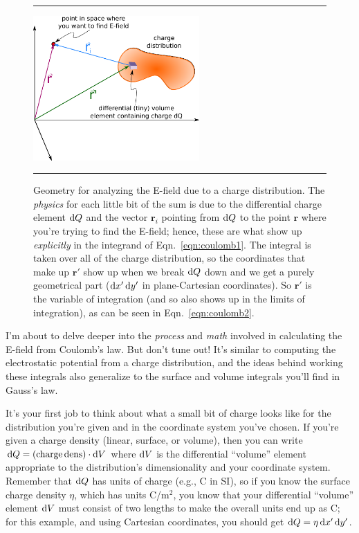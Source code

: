 \documentclass[10pt,letterpaper,twoside]{article}
\begin{document}
\begin{figure}[htb]
  \centering
  \vspace{5pt}
  \hrule%
  \vspace{10pt}
	\centering
	\includegraphics[keepaspectratio=true,width=2.50in]{./coordinate_system.pdf}
    \caption{Geometry for analyzing the E-field due to a charge distribution.
	The \textit{physics} for each little bit of the sum is due to the differential charge element $\text d Q$ and the vector $\bm r_i$ pointing from $\text d Q$ to the point $\bm r$ where you're trying to find the E-field; hence, these are what show up \textit{explicitly} in the integrand of Eqn.~\ref{eqn:coulomb1}.
	The integral is taken over all of the charge distribution, so the coordinates that make up $\bm r'$ show up when we break $\text d Q$ down and we get a purely geometrical part ($\text d x'\,\text d y'$ in plane-Cartesian coordinates).
	So $\bm r'$ is the variable of integration (and so also shows up in the limits of integration), as can be seen in Eqn.~\ref{eqn:coulomb2}.}
    \label{fig:coord_coulomb_distr}
  \hrule%
\vspace{10pt}
\end{figure}

I'm about to delve deeper into the \textit{process} and \textit{math} involved in calculating the E-field from Coulomb's law.
But don't tune out!
It's similar to computing the electrostatic potential from a charge distribution, and the ideas behind working these integrals also generalize to the surface and volume integrals you'll find in Gauss's law.

It's your first job to think about what a small bit of charge looks like for the distribution you're given and in the coordinate system you've chosen.
If you're given a charge density (linear, surface, or volume), then you can write $\text d Q = (\text{charge\,dens}) \cdot \text d V$ where $\text d V$ is the differential ``volume'' element appropriate to the distribution's dimensionality and your coordinate system.
Remember that $\text d Q$ has units of charge (e.g., C in SI), so if you know the surface charge density $\eta$, which has units C/m$^2$, you know that your differential ``volume'' element $\text d V$ must consist of two lengths to make the overall units end up as C; for this example, and using Cartesian coordinates, you should get $\text d Q = \eta \, \text d x'\,\text d y'$.
\end{document}
